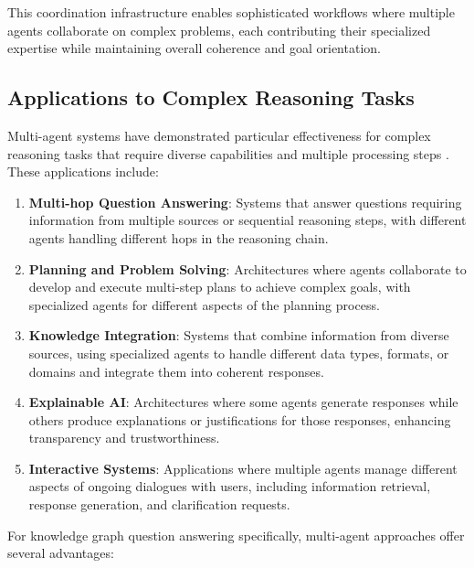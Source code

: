 This coordination infrastructure enables sophisticated workflows where multiple agents collaborate on complex problems, each contributing their specialized expertise while maintaining overall coherence and goal orientation.

\subsection{Applications to Complex Reasoning Tasks}
\label{sec:agent-applications}
Multi-agent systems have demonstrated particular effectiveness for complex reasoning tasks that require diverse capabilities and multiple processing steps \citep{nvidia2024llmagents, aws2025multiagent}. These applications include:

\begin{enumerate}
    \item \textbf{Multi-hop Question Answering}: Systems that answer questions requiring information from multiple sources or sequential reasoning steps, with different agents handling different hops in the reasoning chain.
    
    \item \textbf{Planning and Problem Solving}: Architectures where agents collaborate to develop and execute multi-step plans to achieve complex goals, with specialized agents for different aspects of the planning process.
    
    \item \textbf{Knowledge Integration}: Systems that combine information from diverse sources, using specialized agents to handle different data types, formats, or domains and integrate them into coherent responses.
    
    \item \textbf{Explainable AI}: Architectures where some agents generate responses while others produce explanations or justifications for those responses, enhancing transparency and trustworthiness.
    
    \item \textbf{Interactive Systems}: Applications where multiple agents manage different aspects of ongoing dialogues with users, including information retrieval, response generation, and clarification requests.
\end{enumerate}

For knowledge graph question answering specifically, multi-agent approaches offer several advantages:

